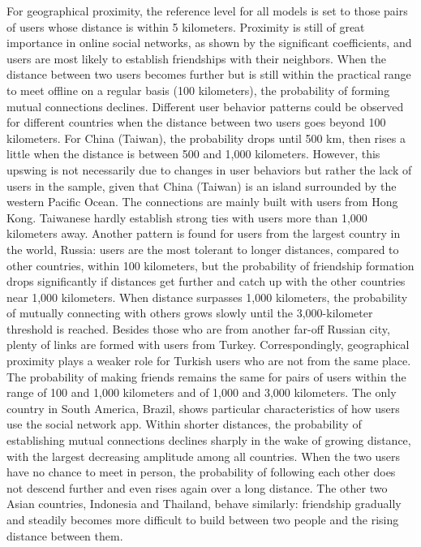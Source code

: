 For geographical proximity, the reference level for all models is set to those pairs of users whose distance is within 5 kilometers. Proximity is still of great importance in online social networks, as shown by the significant coefficients, and users are most likely to establish friendships with their neighbors. When the distance between two users becomes further but is still within the practical range to meet offline on a regular basis (100 kilometers), the probability of forming mutual connections declines. Different user behavior patterns could be observed for different countries when the distance between two users goes beyond 100 kilometers. For China (Taiwan), the probability drops until 500 km, then rises a little when the distance is between 500 and 1,000 kilometers. However, this upswing is not necessarily due to changes in user behaviors but rather the lack of users in the sample, given that China (Taiwan) is an island surrounded by the western Pacific Ocean. The connections are mainly built with users from Hong Kong. Taiwanese hardly establish strong ties with users more than 1,000 kilometers away. Another pattern is found for users from the largest country in the world, Russia: users are the most tolerant to longer distances, compared to other countries, within 100 kilometers, but the probability of friendship formation drops significantly if distances get further and catch up with the other countries near 1,000 kilometers. When distance surpasses 1,000 kilometers, the probability of mutually connecting with others grows slowly until the 3,000-kilometer threshold is reached. Besides those who are from another far-off Russian city, plenty of links are formed with users from Turkey. Correspondingly, geographical proximity plays a weaker role for Turkish users who are not from the same place. The probability of making friends remains the same for pairs of users within the range of 100 and 1,000 kilometers and of 1,000 and 3,000 kilometers. The only country in South America, Brazil, shows particular characteristics of how users use the social network app. Within shorter distances, the probability of establishing mutual connections declines sharply in the wake of growing distance, with the largest decreasing amplitude among all countries. When the two users have no chance to meet in person, the probability of following each other does not descend further and even rises again over a long distance. The other two Asian countries, Indonesia and Thailand, behave similarly: friendship gradually and steadily becomes more difficult to build between two people and the rising distance between them.

